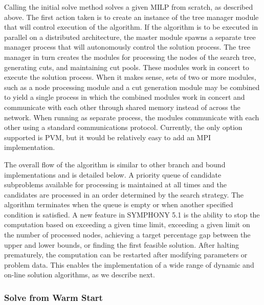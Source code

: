 Calling the initial solve method solves a given MILP from scratch, as
described above. The first action taken is to create an instance of the tree
manager module that will control execution of the algorithm. If the algorithm
is to be executed in parallel on a distributed architecture, the master module
spawns a separate tree manager process that will autonomously control the
solution process. The tree manager in turn creates the modules for processing
the nodes of the search tree, generating cuts, and maintaining cut pools.
These modules work in concert to execute the solution process. When it makes
sense, sets of two or more modules, such as a node processing module and a cut
generation module may be combined to yield a single process in which the
combined modules work in concert and communicate with each other through
shared memory instead of across the network. When running as separate process,
the modules communicate with each other using a standard communications
protocol. Currently, the only option supported is PVM, but it would be
relatively easy to add an MPI implementation.

The overall flow of the algorithm is similar to other branch and bound
implementations and is detailed below. A priority queue of candidate
subproblems available for processing is maintained at all times and the
candidates are processed in an order determined by the search strategy. The
algorithm terminates when the queue is empty or when another specified
condition is satisfied. A new feature in SYMPHONY 5.1 is the ability to stop
the computation based on exceeding a given time limit, exceeding a given limit
on the number of processed nodes, achieving a target percentage gap between
the upper and lower bounds, or finding the first feasible solution. After
halting prematurely, the computation can be restarted after modifying
parameters or problem data. This enables the implementation of a wide range of
dynamic and on-line solution algorithms, as we describe next.

\subsubsection{Solve from Warm Start} \label{warm_solve}


